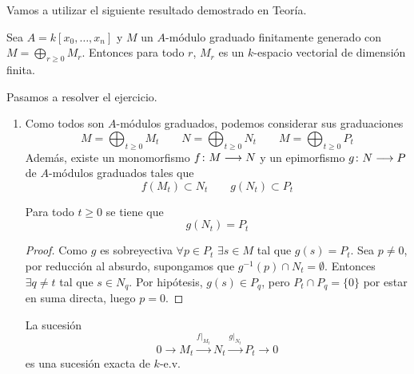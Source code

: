 \documentclass[twoside]{article}
\begin{document}
\begin{solucion}
\begin{itemize}
\begin{solucion}Vamos a utilizar el siguiente resultado demostrado en Teoría.
\begin{lemma}\label{lemma:1}
Sea $A = k[x_0,\dots,x_n]$ y $M$ un $A$-módulo graduado finitamente generado con $M = \bigoplus_{r≥0} M_r$. Entonces para todo $r$, $M_r$ es un $k$-espacio vectorial de dimensión finita.
\end{lemma}
Pasamos a resolver el ejercicio.
\begin{enumerate}
\item  Como todos son $A$-módulos graduados, podemos considerar sus graduaciones
$$
M=\bigoplus_{t\geq 0} M_t \qquad N=\bigoplus_{t\geq 0} N_t \qquad M=\bigoplus_{t\geq 0} P_t $$
Además, existe un monomorfismo $f\colon{M}\longrightarrow{N}$ y un epimorfismo $g\colon{N}\longrightarrow{P}$ de $A$-módulos graduados tales que
\begin{equation}\label{eq:1}
f(M_t) \subset N_t \qquad g(N_t) \subset P_t
\end{equation}
\begin{lemma}\label{lemma:2}
Para todo $t\geq 0$ se tiene que 
$$g(N_t)=P_t$$
\end{lemma}
\begin{proof}
Como $g$ es sobreyectiva $\forall p\in P_t$ $\exists s\in M$ tal que $g(s)=P_t$. Sea $p\neq 0$, por reducción al absurdo, supongamos que $g^{-1}(p)\cap N_t = \emptyset$. Entonces $\exists q\neq t$ tal que $s\in N_q$. Por hipótesis, $g(s)\in P_q$, pero $P_t\cap P_q = \{0\}$ por estar en suma directa, luego $p=0$.
\end{proof}
\begin{lemma}\label{lemma:3} La sucesión
$$0\to M_t\overset{f|_{M_t}}{\to} N_t\overset{g|_{N_t}}{\to} P_t \to 0$$
es una sucesión exacta de $k$-e.v. 
\end{lemma}


\end{enumerate}
\end{solucion}
\end{itemize}
\end{solucion}
\end{document}
